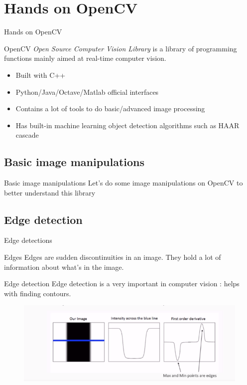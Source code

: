 \documentclass[tikz,table,border=2mm]{beamer}
\begin{document}
\section{Hands on OpenCV}
\begin{frame}{Hands on OpenCV}
    \begin{block}{OpenCV}
        \textit{Open Source Computer Vision Library} is a library of programming functions mainly aimed at real-time computer vision.
    \end{block}
\begin{itemize}
	\item Built with C++
	\item Python/Java/Octave/Matlab official interfaces
	\item Contains a lot of tools to do basic/advanced image processing
	\item Has built-in machine learning object detection algorithms such as HAAR cascade

\end{itemize}
\end{frame}

\subsection{Basic image manipulations}
\begin{frame}{Basic image manipulations}
Let's do some image manipulations on OpenCV to better understand this library 
\end{frame}

\subsection{Edge detection}
\begin{frame}{Edge detections}
\begin{block}{Edges}
	Edges are sudden discontinuities in an image. They hold a lot of information about what's in the image.
\end{block}
\begin{block}{Edge detection}
	Edge detection is a very important in computer vision : helps with finding contours. 
\end{block}
\begin{figure}
    \includegraphics[width=1\linewidth]{images/edge_det_1.png}
\end{figure}
\end{frame}
\end{document}
